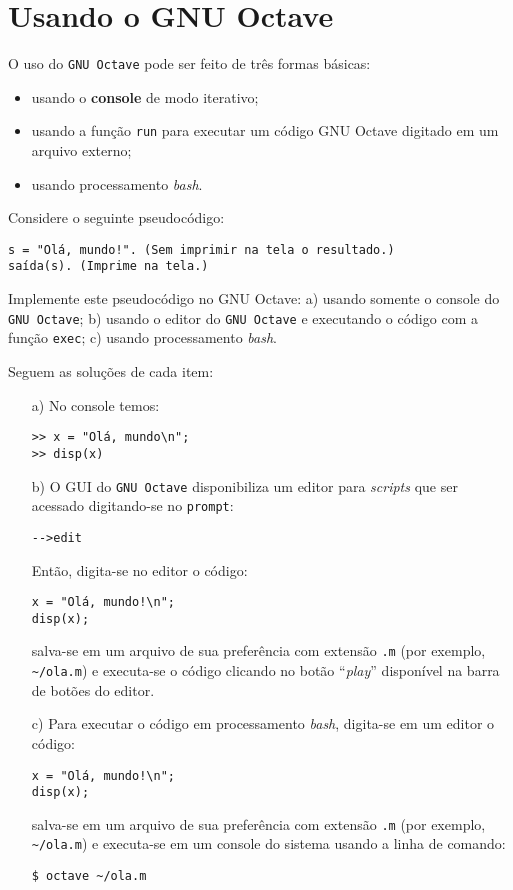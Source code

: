 \section{Usando o GNU Octave}

O uso do \verb+GNU Octave+ pode ser feito de três formas básicas:
\begin{itemize}
\item usando o {\bf console} de modo iterativo;
\item usando a função \verb+run+ para executar um código GNU Octave digitado em um arquivo externo;
\item usando processamento {\it bash}.
\end{itemize}

\begin{ex}
  Considere o seguinte pseudocódigo:
\begin{verbatim}
s = "Olá, mundo!". (Sem imprimir na tela o resultado.)
saída(s). (Imprime na tela.)
\end{verbatim}
Implemente este pseudocódigo no GNU Octave: a) usando somente o console do \verb+GNU Octave+; b) usando o editor do \verb+GNU Octave+ e executando o código com a função \verb+exec+; c) usando processamento {\it bash}.
\end{ex}
\begin{sol} Seguem as soluções de cada item:
  \begin{itemize}
  \item[a)]  No console temos:
\begin{verbatim}
>> x = "Olá, mundo\n";
>> disp(x)
\end{verbatim}
  \item[b)] O GUI do \verb+GNU Octave+ disponibiliza um editor para {\it scripts} que ser acessado digitando-se no \verb+prompt+:
\begin{verbatim}
-->edit
\end{verbatim}
Então, digita-se no editor o código:
\begin{verbatim}
x = "Olá, mundo!\n";
disp(x);
\end{verbatim}
salva-se em um arquivo de sua preferência com extensão \verb+.m+ (por exemplo, \verb+~/ola.m+) e executa-se o código clicando no botão ``{\it play}'' disponível na barra de botões do editor.
\item[c)] Para executar o código em processamento {\it bash}, digita-se em um editor o código:
\begin{verbatim}
x = "Olá, mundo!\n";
disp(x);
\end{verbatim}
salva-se em um arquivo de sua preferência com extensão \verb+.m+ (por exemplo, \verb+~/ola.m+) e executa-se em um console do sistema usando a linha de comando:
\begin{verbatim}
$ octave ~/ola.m
\end{verbatim}
\end{itemize}
\end{sol}

